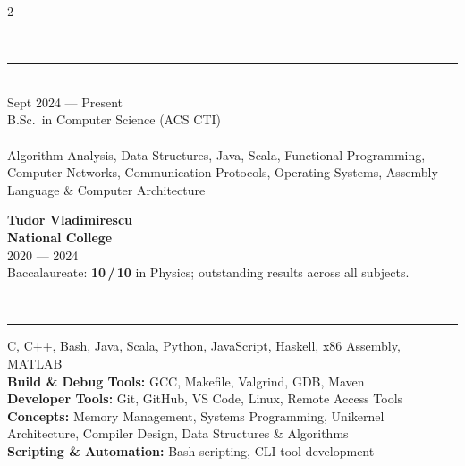 \documentclass[a4paper,10pt]{article}
\newcommand{\cvsection}[1]{%
  \vspace{2pt}%
  \noindent{\small\bfseries\color{navy}\scshape\textls[90]{#1}}%
  \vspace{3pt}\\[-4pt]
  {\color{rule}\rule{\linewidth}{0.5pt}}%
  \vspace{5pt}
}
\begin{document}
\setlength{\columnsep}{0.055\linewidth}
\begin{paracol}{2}


\cvsection{Education}

\\[2pt]
{\small\color{sub}Sept 2024 — Present}\\[3pt]
{\small B.Sc.\ in Computer Science (ACS CTI)}\\[5pt]
{\small\color{sub}\scshape{}}\\[3pt]
{\small Algorithm Analysis, Data Structures, Java, Scala, Functional Programming, Computer Networks, Communication Protocols, Operating Systems, Assembly Language \& Computer Architecture}

\vspace{28pt}

\noindent\textbf{\color{navy}Tudor Vladimirescu}\\
\textbf{\color{navy}National College}\\[2pt]
{\small\color{sub}2020 — 2024}\\[5pt]
{\small Baccalaureate: \textbf{10\,/\,10} in Physics; outstanding results across all subjects.}

\vspace{36pt}

\cvsection{Skills}

 {\small C, C++, Bash, Java, Scala, Python, JavaScript, Haskell, x86 Assembly, MATLAB}\\[17pt]
{\small\textbf{Build \& Debug Tools:}} {\small GCC, Makefile, Valgrind, GDB, Maven}\\[17pt]
{\small\textbf{Developer Tools:}} {\small Git, GitHub, VS Code, Linux, Remote Access Tools}\\[17pt]
{\small\textbf{Concepts:}} {\small Memory Management, Systems Programming, Unikernel Architecture, Compiler Design, Data Structures \& Algorithms}\\[17pt]
{\small\textbf{Scripting \& Automation:}} {\small Bash scripting, CLI tool development}

\switchcolumn


\end{paracol}
\end{document}
